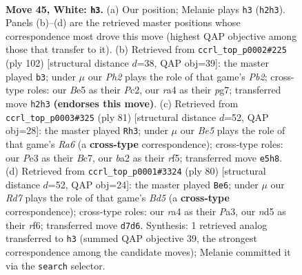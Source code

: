 \documentclass[11pt]{article}
\begin{document}
\clearpage

\begin{figure}[p]\centering
\begin{subfigure}{0.46\textwidth}\centering
\resizebox{\linewidth}{!}{%
\newchessgame
\chessboard[
  setfen={5k2/3R4/2r5/1p1nB1p1/r7/4P1P1/b4P1P/4R1K1 w - - 8 45},
  showmover=false,
  pgfstyle=straightmove, color=movearrow, markmove={h2-h3}
]}
\caption{}
\end{subfigure}\hfill
\begin{subfigure}{0.46\textwidth}\centering
\resizebox{\linewidth}{!}{%
\newchessgame
\chessboard[
  setfen={8/3r2p1/7p/p1k1n2P/6P1/4RPb1/1PP5/1K3R2 w - - 19 52},
  showmover=false,
  pgfstyle=straightmove, color=movearrow, markmove={b2-b3}
]}
\caption{}
\end{subfigure}
\\[4pt]
\begin{subfigure}{0.46\textwidth}\centering
\resizebox{\linewidth}{!}{%
\newchessgame
\chessboard[
  setfen={6R1/kpbr4/p7/3N1R1p/1P1p3P/r7/2PK4/8 b - - 1 41},
  showmover=false,
  pgfstyle=straightmove, color=movearrow, markmove={a3-h3}
]}
\caption{}
\end{subfigure}\hfill
\begin{subfigure}{0.46\textwidth}\centering
\resizebox{\linewidth}{!}{%
\newchessgame
\chessboard[
  setfen={5k2/5nb1/p4r2/1p1B4/5P2/P5PP/1P2R2K/8 w - - 0 41},
  showmover=false,
  pgfstyle=straightmove, color=movearrow, markmove={d5-e6}
]}
\caption{}
\end{subfigure}
\caption{\textbf{Move 45, White: \texttt{h3}.} (a) Our position; Melanie plays \texttt{h3} (\texttt{h2h3}). Panels (b)--(d) are the retrieved master positions whose correspondence most drove this move (highest QAP objective among those that transfer to it). (b) Retrieved from \texttt{ccrl\_top\_p0002\#225} (ply 102) [structural distance $d$=38, QAP obj=39]: the master played \texttt{b3}; under $\mu$ our \emph{Ph2} plays the role of that game's \emph{Pb2}; cross-type roles: our \emph{B}e5 as their \emph{P}c2, our \emph{r}a4 as their \emph{p}g7; transferred move \texttt{h2h3} \textbf{(endorses this move)}. (c) Retrieved from \texttt{ccrl\_top\_p0003\#325} (ply 81) [structural distance $d$=52, QAP obj=28]: the master played \texttt{Rh3}; under $\mu$ our \emph{Be5} plays the role of that game's \emph{Ra6} (a \textbf{cross-type} correspondence); cross-type roles: our \emph{P}e3 as their \emph{B}c7, our \emph{b}a2 as their \emph{r}f5; transferred move \texttt{e5h8}. (d) Retrieved from \texttt{ccrl\_top\_p0001\#3324} (ply 80) [structural distance $d$=52, QAP obj=24]: the master played \texttt{Be6}; under $\mu$ our \emph{Rd7} plays the role of that game's \emph{Bd5} (a \textbf{cross-type} correspondence); cross-type roles: our \emph{r}a4 as their \emph{P}a3, our \emph{n}d5 as their \emph{r}f6; transferred move \texttt{d7d6}. Synthesis: 1 retrieved analog transferred to \texttt{h3} (summed QAP objective 39, the strongest correspondence among the candidate moves); Melanie committed it via the \texttt{search} selector.}
\label{fig:thought-m88}
\end{figure}
\end{document}
